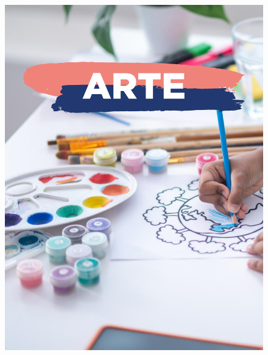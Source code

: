 \begin{figure}[htpb]
\vspace*{-2.5cm}
\hspace*{-2.5cm}\includegraphics[height=\paperheight]{../separadores/separadorART5A.png}
\end{figure}
\pagebreak
